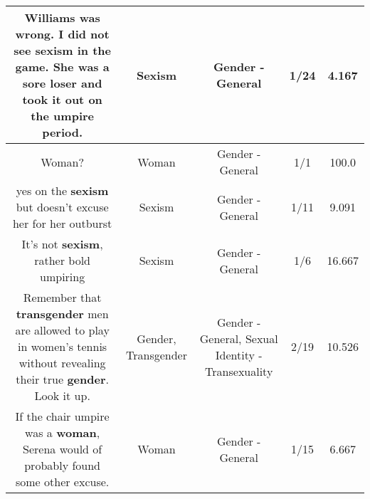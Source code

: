 \documentclass[11pt]{article}
\newlength\mylength
\begin{document}
\begin{center}
\begin{longtable}{|C{.65\mylength}|C{.30\mylength}|C{.12\mylength}|C{.12\mylength}|C{.12\mylength}|}
  \small Williams was wrong. I did not see \textbf{sexism} in the game. She was a sore loser and took it out on the umpire period.\normalsize   & Sexism & Gender - General & 1/24 & 4.167 \\  \hline
  \small Woman?\normalsize   & Woman & Gender - General & 1/1 & 100.0 \\  \hline
  \small yes on the \textbf{sexism} but doesn't excuse her for her outburst\normalsize   & Sexism & Gender - General & 1/11 & 9.091 \\  \hline
  \small It's not \textbf{sexism}, rather bold umpiring\normalsize   & Sexism & Gender - General & 1/6 & 16.667 \\  \hline
  \small Remember that \textbf{transgender} men are allowed to play in women's tennis without revealing their true \textbf{gender}. Look it up.\normalsize   & Gender, Transgender & Gender - General, Sexual Identity - Transexuality & 2/19 & 10.526 \\  \hline
  \small If the chair umpire was a \textbf{woman}, Serena would of probably found some other excuse.\normalsize   & Woman & Gender - General & 1/15 & 6.667 \\  \hline

\end{longtable}
\end{center}
\end{document}

